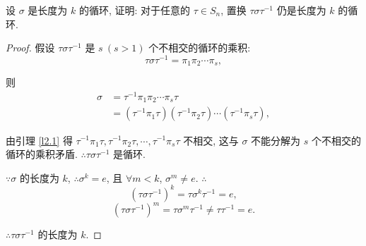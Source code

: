 \documentclass[color=black,device=normal,lang=cn,mode=geye]{elegantnote}
\begin{document}
\begin{exercisec}[2.3.3]
    设 $\sigma$ 是长度为 $k$ 的循环, 证明: 对于任意的 $\tau\in S_n$, 置换 $\tau\sigma\tau^{-1}$ 仍是长度为 $k$ 的循环.
\end{exercisec}
\begin{proof}
    假设 $\tau\sigma\tau^{-1}$ 是 $s\ (s>1)$ 个不相交的循环的乘积:
    \[\tau\sigma\tau^{-1}=\pi_1\pi_2\cdots\pi_s,\]

    则
    \begin{align*}
        \sigma & =\tau^{-1}\pi_1\pi_2\cdots\pi_s\tau \\
        & =(\tau^{-1}\pi_1\tau)(\tau^{-1}\pi_2\tau)\cdots(\tau^{-1}\pi_s\tau),
    \end{align*}

    由引理 \ref{l2.1} 得 $\tau^{-1}\pi_1\tau,\tau^{-1}\pi_2\tau,\cdots,\tau^{-1}\pi_s\tau$ 不相交, 这与 $\sigma$ 不能分解为 $s$ 个不相交的循环的乘积矛盾. $\therefore\tau\sigma\tau^{-1}$ 是循环.

    $\because\sigma$ 的长度为 $k$, $\therefore\sigma^k=e$, 且 $\forall m<k$, $\sigma^m\neq e$. $\therefore$
    \[(\tau\sigma\tau^{-1})^k=\tau\sigma^k\tau^{-1}=e,\]
    \[(\tau\sigma\tau^{-1})^m=\tau\sigma^m\tau^{-1}\neq\tau\tau^{-1}=e.\]

    $\therefore\tau\sigma\tau^{-1}$ 的长度为 $k$.
\end{proof}
\end{document}
